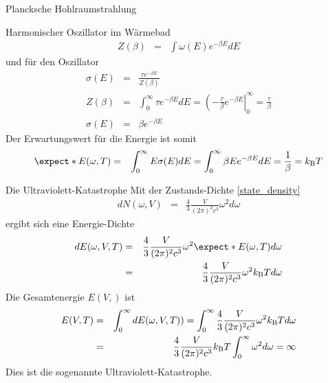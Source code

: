 \begin{chapter}{\titlestr}
\begin{section}{Plancksche Hohlraumstrahlung}
\begin{subsection}{Harmonischer Oszillator im Wärmebad}
\begin{eqnarray*}
Z(\beta) &=& \int\omega(E)e^{-\beta E}dE
\end{eqnarray*}
und für den Oszillator
\begin{eqnarray*}
\sigma(E)&=& \frac{\tau e^{-\beta E}}{Z(\beta)}\\
Z(\beta) &=& \int_0^\infty\tau e^{-\beta E}dE=\left(-\frac{\tau}{\beta}e^{-\beta E}\right|_0^\infty=\frac{\tau}{\beta}\\
\sigma(E)&=& \beta e^{-\beta E}
\end{eqnarray*}
Der Erwartungswert für die Energie ist somit
\begin{eqnarray*}
\expect*{E(\omega,T)} &=& \int_0^\infty E \sigma(E) dE=\int_0^\infty \beta Ee^{-\beta E} dE=\frac{1}{\beta} = \kb T
\end{eqnarray*}
\end{subsection}

\begin{subsection}{Die Ultraviolett-Katastrophe}
Mit der Zustands-Dichte \ref{state_density}
\begin{eqnarray*}
d N(\omega,V) &=& \frac{4}{3}\frac{V}{(2\pi)^2c^3} \omega^2 d\omega
\end{eqnarray*}
ergibt sich eine Energie-Dichte
\begin{eqnarray*}
d E(\omega,V,T) &=& \frac{4}{3}\frac{V}{(2\pi)^2c^3} \omega^2 \expect*{E(\omega,T)} d\omega\\
&=& \frac{4}{3}\frac{V}{(2\pi)^2c^3} \omega^2 \kb T d\omega
\end{eqnarray*}
Die Gesamtenergie $E(V,)$ ist
\begin{eqnarray*}
E(V,T) &=& \int_0^\infty d E(\omega,V,T) )=\int_0^\infty\frac{4}{3}\frac{V}{(2\pi)^2c^3} \omega^2 k_{\mathrm{B}} T d\omega\\
&=&\frac{4}{3}\frac{V}{(2\pi)^2c^3}k_{\mathrm{B}} T \int_0^\infty\omega^2 d\omega =\infty
\end{eqnarray*}
Dies ist die sogenannte Ultraviolett-Katastrophe.
\end{subsection}


\end{section}
\end{chapter}
